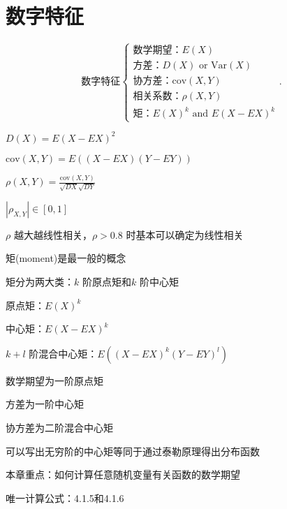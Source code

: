 \section{数字特征}%
\label{sec:数字特征}
\[
    \text{数字特征}\begin{cases}
        \text{数学期望：}E\left( X \right) \\
        \text{方差：}D\left( X \right) \text{ or }\mathrm{Var}\left( X \right) \\
        \text{协方差：}\mathrm{cov}\left( X,Y \right) \\
        \text{相关系数：}\rho\left( X,Y \right) \\
        \text{矩：}E\left( X \right) ^{k} \text{ and } E\left( X-EX \right) ^{k}
    \end{cases}
.\] 
\begin{notation}
    $D\left( X \right) =E\left( X-EX \right) ^2$ 

    $\text{cov}\left( X,Y \right) =E\left( \left( X-EX \right) \left( Y-EY \right)  \right) $

    $ \rho\left( X,Y \right) =\displaystyle{\frac{\text{cov}\left( X,Y \right) }{\sqrt{DX} \sqrt{DY} }}$
\end{notation}
\begin{notation}
    $|\rho_{X,Y}|\in [0,1]$ 
    
    $\rho$ 越大越线性相关，$\rho>0.8$ 时基本可以确定为线性相关
\end{notation}
\begin{notation}
    矩(moment)是最一般的概念

    矩分为两大类：$k$ 阶原点矩和$k$ 阶中心矩

    原点矩：$E\left( X \right) ^{k}$

    中心矩：$E\left( X-EX \right) ^{k}$

    $k+l$ 阶混合中心矩：$E\left( \left( X-EX \right) ^{k}\left( Y-EY \right) ^{l} \right) $
\end{notation}
\begin{eg}
    数学期望为一阶原点矩

    方差为一阶中心矩

    协方差为二阶混合中心矩
\end{eg}
\begin{notation}
    可以写出无穷阶的中心矩等同于通过泰勒原理得出分布函数
    
    本章重点：如何计算任意随机变量有关函数的数学期望

    唯一计算公式：4.1.5和4.1.6
\end{notation}
